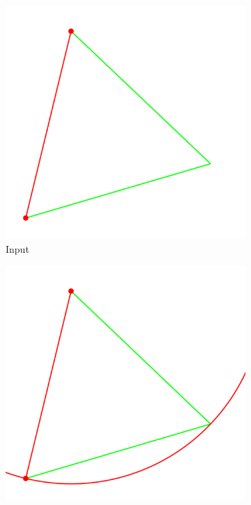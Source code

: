 \begin{figure}[tbp]
     \centering
     \begin{subfigure}[b]{0.32\textwidth}
         \centering
         \includegraphics[width=\textwidth]{img/Equilateral_example/input_image0.png}
         \caption{Input}
         \label{fig:euclidea_example_in}
     \end{subfigure}
     \hfill
     \begin{subfigure}[b]{0.32\textwidth}
         \centering
         \includegraphics[width=\textwidth]{img/Equilateral_example/input_image1.png}

\end{subfigure}
\end{figure}
